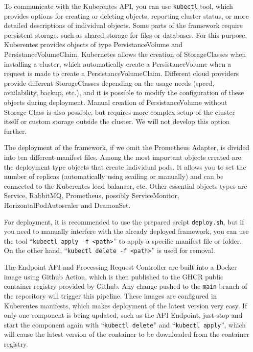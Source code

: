 To communicate with the Kuberentes API, you can use \texttt{kubectl} tool, which provides options for creating or deleting objects, reporting cluster status, or more detailed descriptions of individual objects. Some parts of the framework require persistent storage, such as shared storage for files or databases. For this purpose, Kuberentes provides objects of type PersistanceVolume and PersistanceVolumeClaim. Kubernetes allows the creation of StorageClasses when installing a cluster, which automatically create a PersistanceVolume when a request is made to create a PersistanceVolumeClaim. Different cloud providers provide different StorageClasses depending on the usage needs (speed, availability, backup, etc.), and it is possible to modify the configuration of these objects during deployment. Manual creation of PersistanceVolume without Storage Class is also possible, but requires more complex setup of the cluster itself or custom storage outside the cluster. We will not develop this option further.

The deployment of the framework, if we omit the Prometheus Adapter, is divided into ten different manifest files.  Among the most important objects created are the deployment type objects that create individual pods. It allows you to set the number of replicas (automatically using scailing or manually) and can be connected to the Kuberentes load balancer, etc. Other essential objects types are Service, RabbitMQ, Prometheus, possibly ServiceMonitor, HorizontalPodAutoscaler and DeamonSet.

For deployment, it is recommended to use the prepared srcipt \texttt{deploy.sh}, but if you need to manually interfere with the already deployed framework, you can use the tool “\texttt{kubectl apply -f <path>}” to apply a specific manifest file or folder. On the other hand,  “\texttt{kubectl delete -f <path>}” is used for removal.

The Endpoint API and Processing Request Controller are built into a Docker image using Github Action, which is then published to the GHCR public container registry provided by Github. Any change pushed to the \texttt{main} branch of the repository will trigger this pipeline. These images are configured in Kuberentes manifests, which makes deployment of the latest version very easy. If only one component is being updated, such as the API Endpoint, just stop and start the component again with “\texttt{kubectl delete}” and “\texttt{kubectl apply}”, which will cause the latest version of the container to be downloaded from the container registry.

